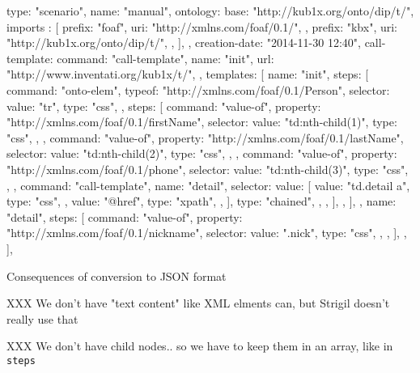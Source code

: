 \begtt
{
  type: "scenario", 
  name: "manual", 
  ontology: {
    base: "http://kub1x.org/onto/dip/t/", 
    imports : [
      {
        prefix: "foaf", 
        uri: "http://xmlns.com/foaf/0.1/", 
      }, 
      {
        prefix: "kbx", 
        uri: "http://kub1x.org/onto/dip/t/", 
      }, 
    ], 
  }, 
  creation-date: "2014-11-30 12:40", 
  call-template: {
    command: "call-template", 
    name: "init", 
    url: "http://www.inventati.org/kub1x/t/", 
  }, 
  templates: [
    {
      name: "init", 
      steps: [
        {
          command: "onto-elem", 
          typeof: "http://xmlns.com/foaf/0.1/Person", 
          selector: {
            value: "tr", 
            type: "css", 
          }, 
          steps: [
            {
              command: "value-of", 
              property: "http://xmlns.com/foaf/0.1/firstName", 
              selector: {
                value: "td:nth-child(1)", 
                type: "css", 
              }, 
            }, 
            {
              command: "value-of", 
              property: "http://xmlns.com/foaf/0.1/lastName", 
              selector: {
                value: "td:nth-child(2)", 
                type:  "css", 
              }, 
            }, 
            {
              command: "value-of", 
              property: "http://xmlns.com/foaf/0.1/phone", 
              selector: {
                value: "td:nth-child(3)", 
                type:  "css", 
              }, 
            },
            {
              command: "call-template", 
              name: "detail", 
              selector: {
                value: [
                  {
                    value: "td.detail a", 
                    type:  "css", 
                  }, 
                  {
                    value: "@href", 
                    type: "xpath", 
                  }, 
                ], 
                type: "chained", 
              }, 
            }, 
          ], 
        }, 
      ], 
    }, 
    {
      name: "detail", 
      steps: [
        {
          command: "value-of", 
          property: "http://xmlns.com/foaf/0.1/nickname", 
          selector: {
            value: ".nick", 
            type:  "css", 
          }, 
        },
      ], 
    }, 
  ], 
}
\endtt

\secc Consequences of conversion to JSON format

XXX We don't have "text content" like XML elments can, but Strigil doesn't really use that

XXX We don't have child nodes.. so we have to keep them in an array, like in {\tt steps} 

